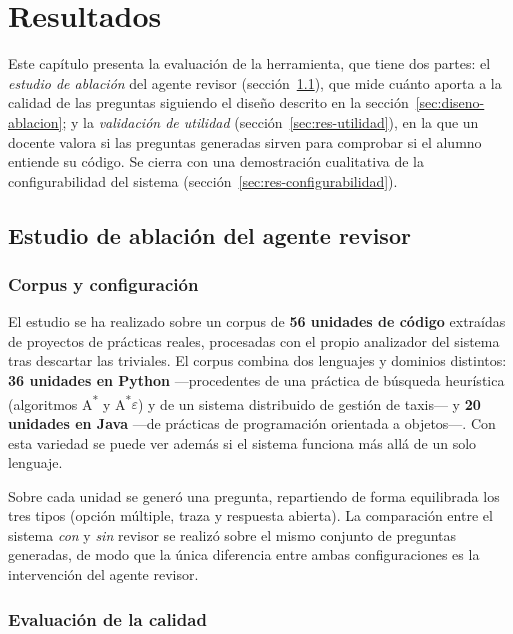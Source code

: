 \chapter{Resultados}
\label{cap:resultados}

Este capítulo presenta la evaluación de la herramienta, que tiene dos partes:
el \emph{estudio de ablación} del agente revisor
(sección~\ref{sec:res-ablacion}), que mide cuánto aporta a la calidad de las
preguntas siguiendo el diseño descrito en la sección~\ref{sec:diseno-ablacion}; y la \emph{validación de utilidad}
(sección~\ref{sec:res-utilidad}), en la que un docente valora si
las preguntas generadas sirven para comprobar si el alumno entiende su código. Se cierra con una demostración cualitativa de la
configurabilidad del sistema (sección~\ref{sec:res-configurabilidad}).


\section{Estudio de ablación del agente revisor}
\label{sec:res-ablacion}

\subsection{Corpus y configuración}
\label{sec:res-corpus}

El estudio se ha realizado sobre un corpus de \textbf{56 unidades de código}
extraídas de proyectos de prácticas reales, procesadas con el propio analizador
del sistema tras descartar las triviales. El corpus combina dos lenguajes y
dominios distintos: \textbf{36 unidades en Python} ---procedentes de una
práctica de búsqueda heurística (algoritmos A\textsuperscript{*} y
A\textsuperscript{*}$\varepsilon$) y de un sistema distribuido de
gestión de taxis--- y \textbf{20 unidades en Java} ---de prácticas de
programación orientada a objetos---. Con esta variedad se puede ver además si el sistema funciona más allá de un
solo lenguaje.

Sobre cada unidad se generó una pregunta, repartiendo de forma equilibrada los
tres tipos (opción múltiple, traza y respuesta abierta). La comparación entre
el sistema \emph{con} y \emph{sin} revisor se realizó sobre el mismo conjunto de
preguntas generadas, de modo que la única diferencia entre ambas
configuraciones es la intervención del agente revisor.

\subsection{Evaluación de la calidad}
\label{sec:res-evaluacion}

